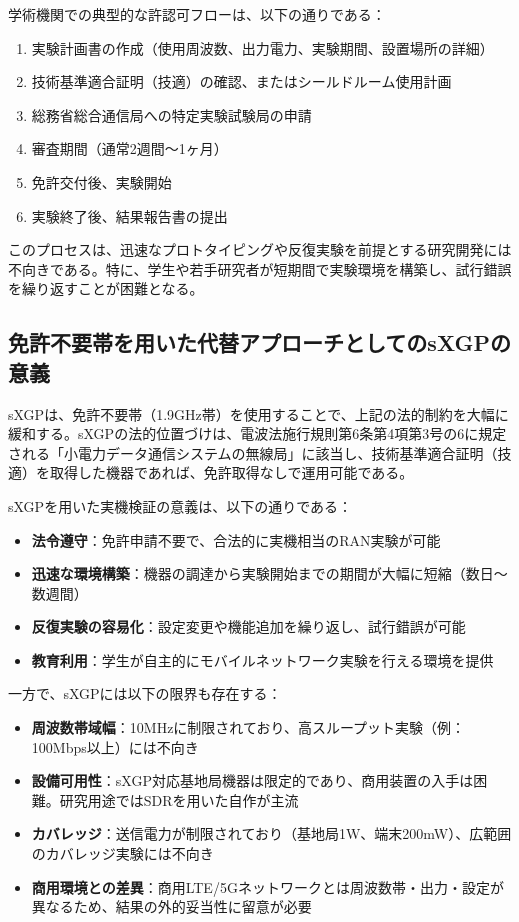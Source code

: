 学術機関での典型的な許認可フローは、以下の通りである：

\begin{enumerate}
\item 実験計画書の作成（使用周波数、出力電力、実験期間、設置場所の詳細）
\item 技術基準適合証明（技適）の確認、またはシールドルーム使用計画
\item 総務省総合通信局への特定実験試験局の申請
\item 審査期間（通常2週間〜1ヶ月）
\item 免許交付後、実験開始
\item 実験終了後、結果報告書の提出
\end{enumerate}

このプロセスは、迅速なプロトタイピングや反復実験を前提とする研究開発には不向きである。特に、学生や若手研究者が短期間で実験環境を構築し、試行錯誤を繰り返すことが困難となる。

\subsection{免許不要帯を用いた代替アプローチとしてのsXGPの意義}

sXGPは、免許不要帯（1.9GHz帯）を使用することで、上記の法的制約を大幅に緩和する。sXGPの法的位置づけは、電波法施行規則第6条第4項第3号の6に規定される「小電力データ通信システムの無線局」に該当し、技術基準適合証明（技適）を取得した機器であれば、免許取得なしで運用可能である。

sXGPを用いた実機検証の意義は、以下の通りである：

\begin{itemize}
\item \textbf{法令遵守}：免許申請不要で、合法的に実機相当のRAN実験が可能
\item \textbf{迅速な環境構築}：機器の調達から実験開始までの期間が大幅に短縮（数日〜数週間）
\item \textbf{反復実験の容易化}：設定変更や機能追加を繰り返し、試行錯誤が可能
\item \textbf{教育利用}：学生が自主的にモバイルネットワーク実験を行える環境を提供
\end{itemize}

一方で、sXGPには以下の限界も存在する：

\begin{itemize}
\item \textbf{周波数帯域幅}：10MHzに制限されており、高スループット実験（例：100Mbps以上）には不向き
\item \textbf{設備可用性}：sXGP対応基地局機器は限定的であり、商用装置の入手は困難。研究用途ではSDRを用いた自作が主流
\item \textbf{カバレッジ}：送信電力が制限されており（基地局1W、端末200mW）、広範囲のカバレッジ実験には不向き
\item \textbf{商用環境との差異}：商用LTE/5Gネットワークとは周波数帯・出力・設定が異なるため、結果の外的妥当性に留意が必要
\end{itemize}

